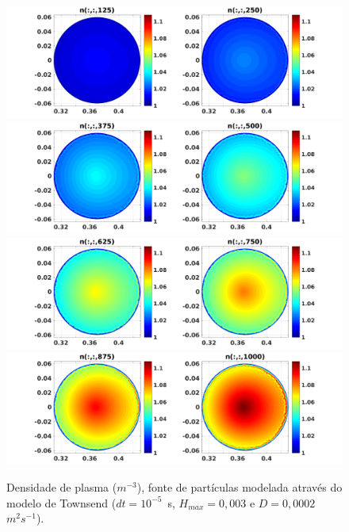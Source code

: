 \documentclass[12pt,oneside,a4paper]{abntex2}
\begin{document}
\begin{figure}[H]
\centering
\includegraphics[scale=0.5]{../SImulacao_breakdown/PDE/ntod1B2.png}  
\includegraphics[scale=0.5]{../SImulacao_breakdown/PDE/ntod2B2.png} 
\includegraphics[scale=0.5]{../SImulacao_breakdown/PDE/ntod3B2.png} 
\includegraphics[scale=0.5]{../SImulacao_breakdown/PDE/ntod4B2.png} 
\caption{Densidade de plasma ($m^{-3}$), fonte de partículas modelada através do modelo de Townsend ($dt=10^{-5}$\ s, $H_{max} = 0,003$ e $D=0,0002$\ $m^2s^{-1}$).}
\label{resucoef1}
\end{figure}
\end{document}
